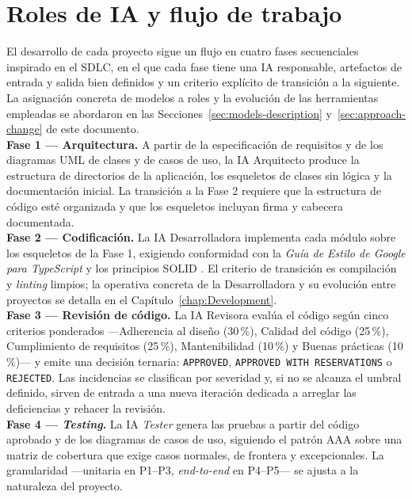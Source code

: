 \section{Roles de IA y flujo de trabajo} \label{sec:flujo-trabajo}

El desarrollo de cada proyecto sigue un flujo en cuatro fases secuenciales inspirado en el \ac{SDLC}, en el que cada fase tiene una \ac{IA} responsable, artefactos de entrada y salida bien definidos y un criterio explícito de transición a la siguiente. La asignación concreta de modelos a roles y la evolución de las herramientas empleadas se abordaron en las Secciones~\ref{sec:models-description} y~\ref{sec:approach-change} de este documento.\\

\textbf{Fase 1 --- Arquitectura.} A partir de la especificación de requisitos y de los diagramas UML \cite{Fowler:2004:UML} de clases y de casos de uso, la \ac{IA} Arquitecto produce la estructura de directorios de la aplicación, los esqueletos de clases sin lógica y la documentación inicial. La transición a la Fase 2 requiere que la estructura de código esté organizada y que los esqueletos incluyan firma y cabecera documentada.\\

\textbf{Fase 2 --- Codificación.} La \ac{IA} Desarrolladora implementa cada módulo sobre los esqueletos de la Fase 1, exigiendo conformidad con la \textit{Guía de Estilo de Google para TypeScript} y los principios \ac{SOLID} \cite{Martin:2003:Agile}. 
El criterio de transición es compilación y \textit{linting} limpios; la operativa concreta de la Desarrolladora y su evolución entre proyectos se detalla en el Capítulo~\ref{chap:Development}.\\

\textbf{Fase 3 --- Revisión de código.} La \ac{IA} Revisora evalúa el código según cinco criterios ponderados ---Adherencia al diseño (30\,\%), Calidad del código (25\,\%), Cumplimiento de requisitos (25\,\%), Mantenibilidad (10\,\%) y Buenas prácticas (10\,\%)--- y emite una decisión ternaria: \texttt{APPROVED}, \texttt{APPROVED WITH RESERVATIONS} o \texttt{REJECTED}. 
Las incidencias se clasifican por severidad y, si no se alcanza el umbral definido, sirven de entrada a una nueva iteración dedicada a arreglar las deficiencias y rehacer la revisión.\\

\textbf{Fase 4 --- \textit{Testing}.} La \ac{IA} \textit{Tester} genera las pruebas a partir del código aprobado y de los diagramas de casos de uso, siguiendo el patrón \ac{AAA} sobre una matriz de cobertura que exige casos normales, de frontera y excepcionales. La granularidad ---unitaria en P1--P3, \textit{end-to-end} en P4--P5--- se ajusta a la naturaleza del proyecto.\\

